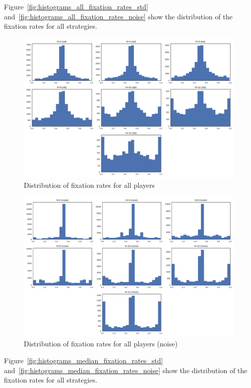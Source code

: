 \documentclass{article}
\begin{document}
Figure~\ref{fig:histograms_all_fixation_rates_std}
and~\ref{fig:histograms_all_fixation_rates_noise} show the distribution of the
fixation rates for all strategies.

\begin{figure}[!hbtp]
    \centering
    \includegraphics[width=.8\textwidth]{../img/histograms_all_fixation_rates_std.pdf}
    \caption{Distribution of fixation rates for all players}
\end{figure}

\begin{figure}[!hbtp]
    \centering
    \includegraphics[width=.8\textwidth]{../img/histograms_all_fixation_rates_noise.pdf}
    \caption{Distribution of fixation rates for all players (noise)}
\end{figure}

Figure~\ref{fig:histograms_median_fixation_rates_std}
and~\ref{fig:histograms_median_fixation_rates_noise} show the distribution of the
fixation rates for all strategies.
\end{document}
